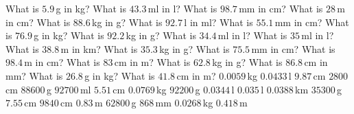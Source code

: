 \documentclass[10pt]{exam}
\begin{document}
\extraheadheight{1in}
\headrule
\extrawidth{0.5in}
\extrafootheight{0.9in}

\large
\begin{multicols*}{2}
\begin{questions}
\question What is $5.9\,$g in kg?
\question What is $43.3\,$ml in l?
\question What is $98.7\,$mm in cm?
\question What is $28\,$m in cm?
\question What is $88.6\,$kg in g?
\question What is $92.7\,$l in ml?
\question What is $55.1\,$mm in cm?
\question What is $76.9\,$g in kg?
\question What is $92.2\,$kg in g?
\question What is $34.4\,$ml in l?
\question What is $35\,$ml in l?
\question What is $38.8\,$m in km?
\question What is $35.3\,$kg in g?
\question What is $75.5\,$mm in cm?
\question What is $98.4\,$m in cm?
\question What is $83\,$cm in m?
\question What is $62.8\,$kg in g?
\question What is $86.8\,$cm in mm?
\question What is $26.8\,$g in kg?
\question What is $41.8\,$cm in m?
\question $0.0059\,$kg
\question $0.0433\,$l
\question $9.87\,$cm
\question $2800\,$cm
\question $88600\,$g
\question $92700\,$ml
\question $5.51\,$cm
\question $0.0769\,$kg
\question $92200\,$g
\question $0.0344\,$l
\question $0.035\,$l
\question $0.0388\,$km
\question $35300\,$g
\question $7.55\,$cm
\question $9840\,$cm
\question $0.83\,$m
\question $62800\,$g
\question $868\,$mm
\question $0.0268\,$kg
\question $0.418\,$m
\end{questions}
\end{multicols*}
\end{document}
